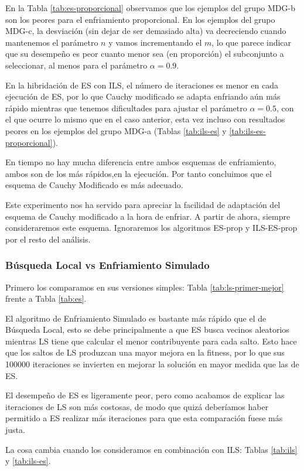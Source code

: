 \documentclass{article}
\begin{document}
En la Tabla \ref{tab:es-proporcional} observamos que los ejemplos del grupo MDG-b son los peores para el enfriamiento
proporcional. En los ejemplos del grupo MDG-c, la desviación (sin dejar de ser demasiado alta) va decreciendo cuando
mantenemos el parámetro $n$ y vamos incrementando el $m$, lo que parece indicar que su desempeño es peor cuanto menor sea
(en proporción) el subconjunto a seleccionar, al menos para el parámetro $\alpha=0.9$.

En la hibridación de ES con ILS, el número de iteraciones es menor en cada ejecución de ES, por lo que Cauchy modificado
se adapta enfriando aún más rápido mientras que tenemos dificultades para ajustar el parámetro $\alpha=0.5$, con el que ocurre
lo mismo que en el caso anterior, esta vez incluso con resultados peores en los ejemplos del grupo MDG-a (Tablas \ref{tab:ils-es} y \ref{tab:ils-es-proporcional}).

En tiempo no hay mucha diferencia entre ambos esquemas de enfriamiento, ambos son de los más rápidos,en la ejecución. Por tanto
concluimos que el esquema de Cauchy Modificado es más adecuado.

Este experimento nos ha servido para apreciar la facilidad de adaptación del esquema de Cauchy modificado a la hora de enfriar.
A partir de ahora, siempre consideraremos este esquema. Ignoraremos los algoritmos ES-prop y ILS-ES-prop por el resto del
análisis.

\subsubsection*{Búsqueda Local vs Enfriamiento Simulado}

Primero los comparamos en sus versiones simples: Tabla \ref{tab:ls-primer-mejor} frente a Tabla \ref{tab:es}.

El algoritmo de Enfriamiento Simulado es bastante más rápido que el de Búsqueda Local, esto se debe principalmente a que ES
busca vecinos aleatorios mientras LS tiene que calcular el menor contribuyente para cada salto. Esto hace que los saltos de
LS produzcan una mayor mejora en la fitness, por lo que sus 100000 iteraciones se invierten en mejorar la solución en mayor
medida que las de ES.

El desempeño de ES es ligeramente peor, pero como acabamos de explicar las iteraciones de LS son más costosas, de modo
que quizá deberíamos haber permitido a ES realizar más iteraciones para que esta comparación fuese más justa.

La cosa cambia cuando los consideramos en combinación con ILS: Tablas \ref{tab:ils} y \ref{tab:ils-es}.
\end{document}

